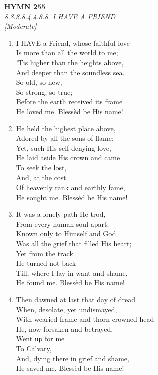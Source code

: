 \documentclass[11pt,a4paper]{article}
\begin{document}
\newpage
\begin{center}
    {\Large \textbf{HYMN 255}}
    \\
    \textit{8.8.8.8.4.4.8.8. I HAVE A FRIEND}
    \\
    \textit{\small [Moderate]}
\end{center}
\vspace{1em}

\begin{enumerate}
    \item I HAVE a Friend, whose faithful love \\
        Is more than all the world to me; \\
        'Tis higher than the heights above, \\
        And deeper than the soundless sea. \\
            So old, so new, \\
            So strong, so true; \\
        Before the earth received its frame \\
        He loved me. Bless\`ed be His name!

    \item He held the highest place above, \\
        Adored by all the sons of flame; \\
        Yet, such His self-denying love, \\
        He laid aside His crown and came \\
            To seek the lost, \\
            And, at the cost \\
        Of heavenly rank and earthly fame, \\
        He sought me. Bless\`ed be His name!

    \item It was a lonely path He trod, \\
        From every human soul apart; \\
        Known only to Himself and God \\
        Was all the grief that filled His heart; \\
            Yet from the track \\
            He turned not back \\
        Till, where I lay in want and shame, \\
        He found me. Bless\`ed be His name!

    \item Then dawned at last that day of dread \\
        When, desolate, yet undismayed, \\
        With wearied frame and thorn-crowned head \\
        He, now forsaken and betrayed, \\
            Went up for me \\
            To Calvary, \\
        And, dying there in grief and shame, \\
        He saved me. Bless\`ed be His name!


\end{enumerate}
\end{document}
